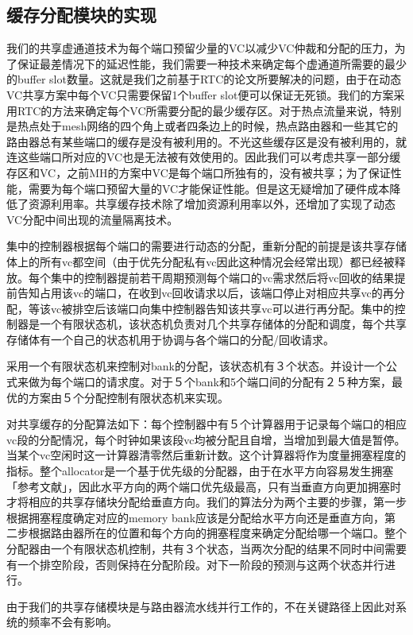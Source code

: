 ﻿\documentclass[10pt,journal]{IEEEtran}
\begin{document}
\subsection{缓存分配模块的实现}
我们的共享虚通道技术为每个端口预留少量的VC以减少VC仲裁和分配的压力，为了保证最差情况下的延迟性能，我们需要一种技术来确定每个虚通道所需要的最少的buffer slot数量。这就是我们之前基于RTC的论文所要解决的问题，由于在动态VC共享方案中每个VC只需要保留1个buffer slot便可以保证无死锁。我们的方案采用RTC的方法来确定每个VC所需要分配的最少缓存区。对于热点流量来说，特别是热点处于mesh网络的四个角上或者四条边上的时候，热点路由器和一些其它的路由器总有某些端口的缓存是没有被利用的。不光这些缓存区是没有被利用的，就连这些端口所对应的VC也是无法被有效使用的。因此我们可以考虑共享一部分缓存区和VC，之前MH的方案中VC是每个端口所独有的，没有被共享；为了保证性能，需要为每个端口预留大量的VC才能保证性能。但是这无疑增加了硬件成本降低了资源利用率。共享缓存技术除了增加资源利用率以外，还增加了实现了动态VC分配中间出现的流量隔离技术。

集中的控制器根据每个端口的需要进行动态的分配，重新分配的前提是该共享存储体上的所有vc都空间（由于优先分配私有vc因此这种情况会经常出现）都已经被释放。每个集中的控制器提前若干周期预测每个端口的vc需求然后将vc回收的结果提前告知占用该vc的端口，在收到vc回收请求以后，该端口停止对相应共享vc的再分配，等该vc被排空后该端口向集中控制器告知该共享vc可以进行再分配。集中的控制器是一个有限状态机，该状态机负责对几个共享存储体的分配和调度，每个共享存储体有一个自己的状态机用于协调与各个端口的分配/回收请求。

采用一个有限状态机来控制对bank的分配，该状态机有３个状态。并设计一个公式来做为每个端口的请求度。对于５个bank和5个端口间的分配有２５种方案，最优的方案由５个分配控制有限状态机来实现。

对共享缓存的分配算法如下：每个控制器中有５个计算器用于记录每个端口的相应vc段的分配情况，每个时钟如果该段vc均被分配且自增，当增加到最大值是暂停。当某个vc空闲时这一计算器清零然后重新计数。这个计算器将作为度量拥塞程度的指标。整个allocator是一个基于优先级的分配器，由于在水平方向容易发生拥塞「参考文献」，因此水平方向的两个端口优先级最高，只有当垂直方向更加拥塞时才将相应的共享存储块分配给垂直方向。我们的算法分为两个主要的步骤，第一步根据拥塞程度确定对应的memory bank应该是分配给水平方向还是垂直方向，第二步根据路由器所在的位置和每个方向的拥塞程度来确定分配给哪一个端口。整个分配器由一个有限状态机控制，共有３个状态，当两次分配的结果不同时中间需要有一个排空阶段，否则保持在分配阶段。对下一阶段的预测与这两个状态并行进行。

由于我们的共享存储模块是与路由器流水线并行工作的，不在关键路径上因此对系统的频率不会有影响。
\end{document}
